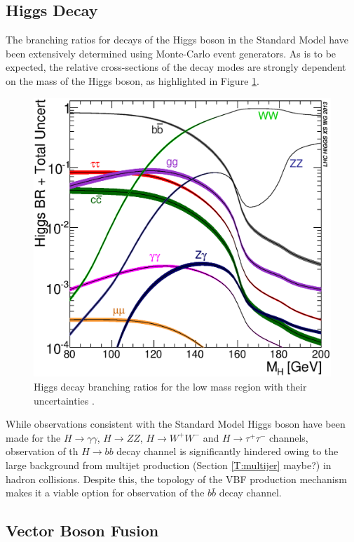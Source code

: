 	\subsection{Higgs Decay} 
	
		The branching ratios for decays of the Higgs boson in the Standard Model have been extensively determined using Monte-Carlo event generators. As is to be expected, the relative cross-sections of the decay modes are strongly dependent on the mass of the Higgs boson, as highlighted in Figure \ref{fig:higgsbrlm}. 
	
		\begin{figure}[h]
			\centering
			\includegraphics[width=0.5\linewidth]{T/FIGS/Higgs_BR_LM}
			\caption{Higgs decay branching ratios for the low mass region with their uncertainties \cite{LHCHiggsXS2013}.}
			\label{fig:higgsbrlm}
		\end{figure}
		
		While observations consistent with the Standard Model Higgs boson have been made for the $H\rightarrow \gamma\gamma$, $H\rightarrow ZZ$, $H\rightarrow W^+W^-$ and $H\rightarrow \tau^+\tau^-$ channels, observation of th $H\rightarrow bb$ decay channel is significantly hindered owing to the large background from multijet production (Section \ref{T:multijer} maybe?) in hadron collisions. Despite this, the topology of the VBF production mechanism makes it a viable option for observation of the  $b\bar{b}$ decay channel.

	
	\subsection{Vector Boson Fusion}
	
	
	
	
\endinput
